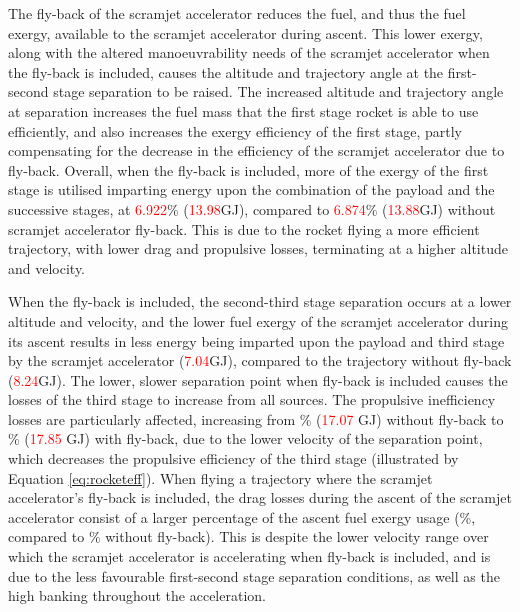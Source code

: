 The fly-back of the scramjet accelerator reduces the fuel, and thus the fuel exergy, available to the scramjet accelerator during ascent.
This lower exergy, along with the altered manoeuvrability needs of the scramjet accelerator when the fly-back is included, causes the altitude and trajectory angle at the first-second stage separation to be raised. The increased altitude and trajectory angle at separation increases the fuel mass that the first stage rocket is able to use efficiently, and also increases the exergy efficiency of the first stage, partly compensating for the decrease in the efficiency of the scramjet accelerator due to fly-back. Overall, when the fly-back is included, more of the exergy of the first stage is utilised imparting energy upon the combination of the payload and the successive stages, at \textcolor{red}{6.922}\% (\textcolor{red}{13.98}GJ), compared to \textcolor{red}{6.874}\% (\textcolor{red}{13.88}GJ) without scramjet accelerator fly-back. This is due to the rocket flying a more efficient trajectory, with lower drag and propulsive losses, terminating at a higher altitude and velocity.

When the fly-back is included, the second-third stage separation occurs at a lower altitude and velocity, and the lower fuel exergy of the scramjet accelerator during its ascent results in less energy being imparted upon the payload and third stage by the scramjet accelerator (\textcolor{red}{7.04}GJ), compared to the trajectory without fly-back (\textcolor{red}{8.24}GJ). 
The lower, slower separation point when fly-back is included causes the losses of the third stage to increase from all sources. The propulsive inefficiency losses are particularly affected, increasing from \PlossthreeCombinedStandardNoReturn \% (\textcolor{red}{17.07} GJ) without fly-back to \PlossthreeCombinedStandard \% (\textcolor{red}{17.85} GJ) with fly-back, due to the lower velocity of the separation point, which decreases the propulsive efficiency of the third stage (illustrated by Equation \ref{eq:rocketeff}).
When flying a trajectory where the scramjet accelerator's fly-back is included, the drag losses during the ascent of the scramjet accelerator consist of a larger percentage of the ascent fuel exergy usage  (\WDsecondStandard \%, compared to \WDsecondStandardNoReturn \% without fly-back). This is despite the lower velocity range over which the scramjet accelerator is accelerating when fly-back is included, and is due to the less favourable first-second stage separation conditions, as well as the high banking throughout the acceleration. 


